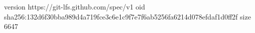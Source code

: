 version https://git-lfs.github.com/spec/v1
oid sha256:132d6f30bba989d4a719fce3c6e1c9f7e7f6ab5256fa6214d078efdaf1d0ff2f
size 6647
